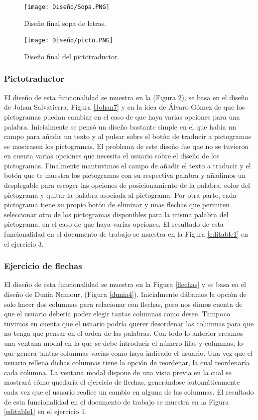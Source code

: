 \begin{figure}[ht!]
  \centering
  \texttt{[image: Diseño/Sopa.PNG]}
  \caption{Diseño final sopa de letras.}
  \label{sopaLetras}
\end{figure}

\begin{figure}[ht!]
  \centering
  \texttt{[image: Diseño/picto.PNG]}
  \caption{Diseño final del pictotraductor.}
  \label{pictotraductor}
\end{figure}

\subsubsection{Pictotraductor}
El diseño de esta funcionalidad se muestra en la (Figura \ref{pictotraductor}), se basa en el diseño de Johan Salvatierra, Figura \ref{Johan7} y en la idea de Álvaro Gómez de que los pictogramas puedan cambiar en el caso de que haya varias opciones para una palabra. Inicialmente se pensó un diseño bastante simple en el que había un campo para añadir un texto y al pulsar sobre el botón de traducir a pictogramas se mostrasen los pictogramas. El problema de este diseño fue que no se tuvieron en cuenta varias opciones que necesita el usuario sobre el diseño de los pictogramas. Finalmente mantuvimos el campo de añadir el texto a traducir y el botón que te muestra los pictogramas con su respectiva palabra y añadimos un desplegable para escoger las opciones de posicionamiento de la palabra, color del pictograma y quitar la palabra asociada al pictograma. Por otra parte, cada pictograma tiene su propio botón de eliminar y unas flechas que permiten seleccionar otro de los pictogramas disponibles para la misma palabra del pictograma, en el caso de que haya varias opciones. El resultado de esta funcionalidad en el documento de trabajo se muestra en la Figura \ref{editable1} en el ejercicio 3.

\subsubsection{Ejercicio de flechas}
El diseño de esta funcionalidad se muestra en la Figura \ref{flechas} y se basa en el diseño de Dunia Namour, (Figura \ref{dunia4}). Inicialmente dábamos la opción de solo hacer dos columnas para relacionar con flechas, pero nos dimos cuenta de que el usuario debería poder elegir tantas columnas como desee. Tampoco tuvimos en cuenta que el usuario podría querer desordenar las columnas para que no tenga que pensar en el orden de las palabras. Con todo lo anterior creamos una ventana modal en la que se debe introducir el número filas y columnas, lo que genera tantas columnas vacías como haya indicado el usuario. Una vez que el usuario rellena dichas columnas tiene la opción de reordenar, la cual reordenaría cada columna. La ventana modal dispone de una vista previa en la cual se mostrará cómo quedaría el ejercicio de flechas, generándose automáticamente cada vez que el usuario realice un cambio en alguna de las columnas. El resultado de esta funcionalidad en el documento de trabajo se muestra en la Figura \ref{editable1} en el ejercicio 1.

